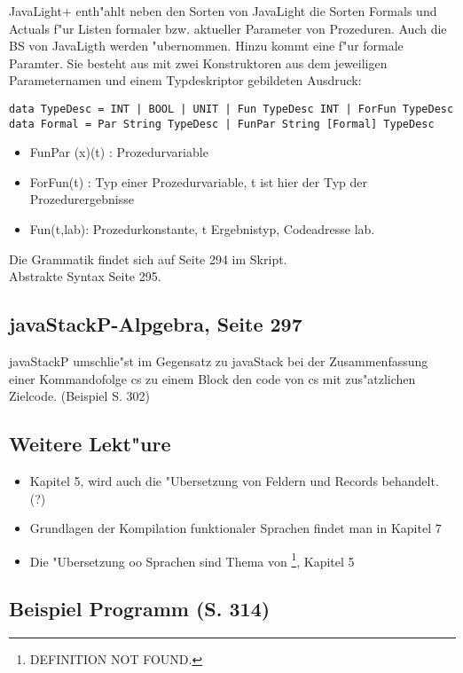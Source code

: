 \documentclass[11pt]{article}
\begin{document}
JavaLight+ enth"ahlt neben den Sorten von JavaLight die Sorten Formals und Actuals f"ur Listen formaler bzw. aktueller Parameter von 
Prozeduren. Auch die BS von JavaLigth werden "ubernommen. Hinzu kommt eine f"ur formale Paramter. Sie besteht aus mit zwei 
Konstruktoren aus dem jeweiligen Parameternamen und einem Typdeskriptor gebildeten Ausdruck:

\begin{verbatim}
data TypeDesc = INT | BOOL | UNIT | Fun TypeDesc INT | ForFun TypeDesc
data Formal = Par String TypeDesc | FunPar String [Formal] TypeDesc
\end{verbatim}
\begin{itemize}
\item FunPar (x)(t) : Prozedurvariable
\item ForFun(t) : Typ einer Prozedurvariable, t ist hier der Typ der Prozedurergebnisse
\item Fun(t,lab): Prozedurkonstante, t Ergebnistyp, Codeadresse lab.
\end{itemize}

Die Grammatik findet sich auf Seite 294 im Skript. \\
Abstrakte Syntax Seite 295. \\
\subsection{javaStackP-Alpgebra, Seite 297}
\label{sec-13-3}

javaStackP umschlie"st im Gegensatz zu javaStack bei der Zusammenfassung einer Kommandofolge cs zu einem Block den code von cs mit 
zus"atzlichen Zielcode. (Beispiel S. 302)

\subsection{Weitere Lekt"ure}
\label{sec-13-4}
\begin{itemize}
\item Kapitel 5, wird auch die "Ubersetzung von Feldern und Records behandelt. (?)
\item Grundlagen der Kompilation funktionaler Sprachen findet man in Kapitel 7
\item Die "Ubersetzung oo Sprachen sind Thema von \footnote{DEFINITION NOT FOUND.}, Kapitel 5
\end{itemize}

\subsection{Beispiel Programm (S. 314)}
\label{sec-13-5}
\end{document}
